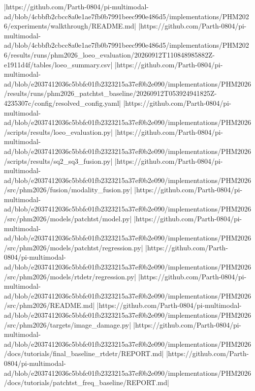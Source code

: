 |https://github.com/Parth-0804/pi-multimodal-ad/blob/4cbbfb2cbcc8a0e1ae7fb0b7991beec990e486d5/implementations/PHM2026/experiments/walkthrough/README.md|
|https://github.com/Parth-0804/pi-multimodal-ad/blob/4cbbfb2cbcc8a0e1ae7fb0b7991beec990e486d5/implementations/PHM2026/results/runs/phm2026_loeo_evaluation/20260912T110848985882Z-e1911d4f/tables/loeo_summary.csv|
|https://github.com/Parth-0804/pi-multimodal-ad/blob/e2037412036c5bbfc01fb2323215a37ef0b2e090/implementations/PHM2026/results/runs/phm2026_patchtst_baseline/20260912T053924941825Z-4235307c/config/resolved_config.yaml|
|https://github.com/Parth-0804/pi-multimodal-ad/blob/e2037412036c5bbfc01fb2323215a37ef0b2e090/implementations/PHM2026/scripts/results/loeo_evaluation.py|
|https://github.com/Parth-0804/pi-multimodal-ad/blob/e2037412036c5bbfc01fb2323215a37ef0b2e090/implementations/PHM2026/scripts/results/sq2_sq3_fusion.py|
|https://github.com/Parth-0804/pi-multimodal-ad/blob/e2037412036c5bbfc01fb2323215a37ef0b2e090/implementations/PHM2026/src/phm2026/fusion/modality_fusion.py|
|https://github.com/Parth-0804/pi-multimodal-ad/blob/e2037412036c5bbfc01fb2323215a37ef0b2e090/implementations/PHM2026/src/phm2026/models/patchtst/model.py|
|https://github.com/Parth-0804/pi-multimodal-ad/blob/e2037412036c5bbfc01fb2323215a37ef0b2e090/implementations/PHM2026/src/phm2026/models/patchtst/regression.py|
|https://github.com/Parth-0804/pi-multimodal-ad/blob/e2037412036c5bbfc01fb2323215a37ef0b2e090/implementations/PHM2026/src/phm2026/models/rtdetr/regression.py|
|https://github.com/Parth-0804/pi-multimodal-ad/blob/e2037412036c5bbfc01fb2323215a37ef0b2e090/implementations/PHM2026/src/phm2026/README.md|
|https://github.com/Parth-0804/pi-multimodal-ad/blob/e2037412036c5bbfc01fb2323215a37ef0b2e090/implementations/PHM2026/src/phm2026/targets/image_damage.py|
|https://github.com/Parth-0804/pi-multimodal-ad/blob/e2037412036c5bbfc01fb2323215a37ef0b2e090/implementations/PHM2026/docs/tutorials/final_baseline_rtdetr/REPORT.md|
|https://github.com/Parth-0804/pi-multimodal-ad/blob/e2037412036c5bbfc01fb2323215a37ef0b2e090/implementations/PHM2026/docs/tutorials/patchtst_freq_baseline/REPORT.md|
